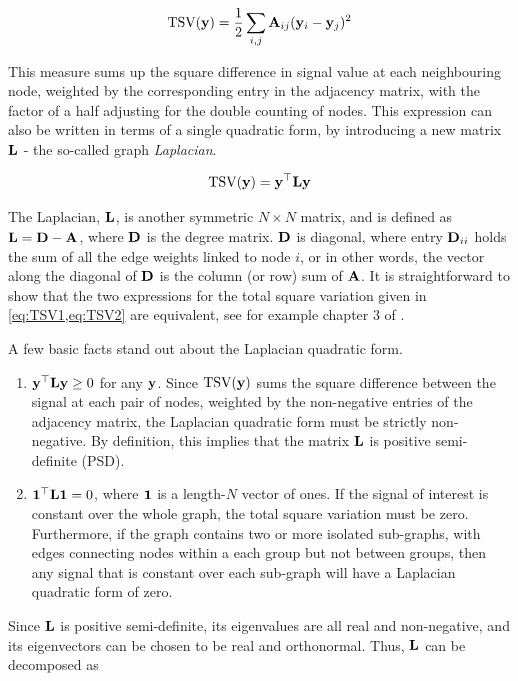 \begin{equation}
    \label{eq:TSV1}
    \text{TSV}(\mathbf{y}) = \frac{1}{2}\sum_{i, j} \mathbf{A}_{ij} (\mathbf{y}_i - \mathbf{y}_j)^2
\end{equation}

This measure sums up the square difference in signal value at each neighbouring node, weighted by the corresponding entry in the adjacency matrix, with the factor of a half adjusting for the double counting of nodes. This expression can also be written in terms of a single quadratic form, by introducing a new matrix $\mathbf{L}$ - the so-called graph \textit{Laplacian}. 

\begin{equation}
    \label{eq:TSV2}
    \text{TSV}(\mathbf{y}) = \mathbf{y}^\top \mathbf{L} \mathbf{y}
\end{equation}

The Laplacian, $\mathbf{L}$, is another symmetric $N \times N$ matrix, and is defined as $\mathbf{L} = \mathbf{D} - \mathbf{A}$, where $\mathbf{D}$ is the degree matrix. $\mathbf{D}$ is diagonal, where entry $\mathbf{D}_{ii}$ holds the sum of all the edge weights linked to node $i$, or in other words, the vector along the diagonal of $\mathbf{D}$ is the column (or row) sum of $\mathbf{A}$. It is straightforward to show that the two expressions for the total square variation given in \cref{eq:TSV1,eq:TSV2} are equivalent, see for example chapter 3 of \cite{Ortega2022}. 

\newpage

A few basic facts stand out about the Laplacian quadratic form.

\begin{enumerate}
    \item $\mathbf{y}^\top \mathbf{L} \mathbf{y} \geq 0$ for any $\mathbf{y}$. Since $\text{TSV}(\mathbf{y})$ sums the square difference between the signal at each pair of nodes, weighted by the non-negative entries of the adjacency matrix, the Laplacian quadratic form must be strictly non-negative. By definition, this implies that the matrix $\mathbf{L}$ is positive semi-definite (PSD). 
    \item $\mathbf{1}^\top \mathbf{L} \mathbf{1} = 0$, where $\mathbf{1}$ is a length-$N$ vector of ones. If the signal of interest is constant over the whole graph, the total square variation must be zero. Furthermore, if the graph contains two or more isolated sub-graphs, with edges connecting nodes within a each group but not between groups, then any signal that is constant over each sub-graph will have a Laplacian quadratic form of zero. 
\end{enumerate}

Since $\mathbf{L}$ is positive semi-definite, its eigenvalues are all real and non-negative, and its eigenvectors can be chosen to be real and orthonormal. Thus, $\mathbf{L}$ can be decomposed as 

